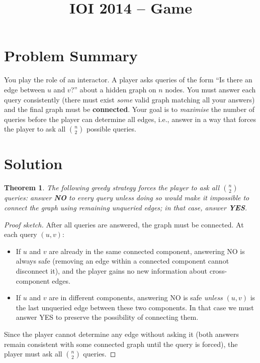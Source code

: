 \documentclass[11pt,a4paper]{article}
\title{IOI 2014 -- Game}
\author{}
\date{}
\newtheorem{theorem}{Theorem}
\begin{document}
\maketitle

\section{Problem Summary}

You play the role of an interactor. A player asks queries of the form ``Is there an edge between $u$ and $v$?'' about a hidden graph on $n$ nodes. You must answer each query consistently (there must exist \emph{some} valid graph matching all your answers) and the final graph must be \textbf{connected}. Your goal is to \emph{maximise} the number of queries before the player can determine all edges, i.e., answer in a way that forces the player to ask all $\binom{n}{2}$ possible queries.

\section{Solution}

\begin{theorem}
The following greedy strategy forces the player to ask all $\binom{n}{2}$ queries: answer \textbf{NO} to every query unless doing so would make it impossible to connect the graph using remaining unqueried edges; in that case, answer \textbf{YES}.
\end{theorem}

\begin{proof}[Proof sketch]
After all queries are answered, the graph must be connected. At each query $(u,v)$:
\begin{itemize}
  \item If $u$ and $v$ are already in the same connected component, answering NO is always safe (removing an edge within a connected component cannot disconnect it), and the player gains no new information about cross-component edges.
  \item If $u$ and $v$ are in different components, answering NO is safe \emph{unless} $(u,v)$ is the last unqueried edge between these two components. In that case we must answer YES to preserve the possibility of connecting them.
\end{itemize}
Since the player cannot determine any edge without asking it (both answers remain consistent with some connected graph until the query is forced), the player must ask all $\binom{n}{2}$ queries.
\end{proof}
\end{document}
